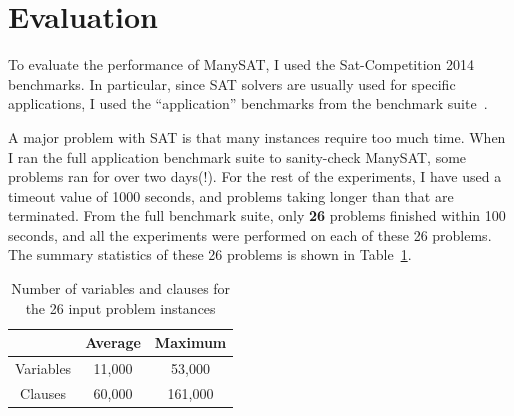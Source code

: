 \documentclass{article}
\begin{document}


















\section{Evaluation}

To evaluate the performance of ManySAT, I used the Sat-Competition
2014~\cite{sc14} benchmarks. In particular, since SAT solvers are
usually used for specific applications, I used the ``application''
benchmarks from the benchmark suite~\cite{sc14-app}.


A major problem with SAT is that many instances require too much
time. When I ran the full application benchmark suite to sanity-check
ManySAT, some problems ran for over two days(!). For the rest of the
experiments, I have used a timeout value of 1000 seconds, and problems
taking longer than that are terminated. From the full benchmark suite,
only \textbf{26} problems finished within 100 seconds, and all the
experiments were performed on each of these 26 problems. The summary
statistics of these 26 problems is shown in
Table~\ref{tab:input-stats}.

\begin{table}[h]
  \centering
  \begin{tabular}[h]{|c|c|c|}
\hline
     & Average & Maximum \\
\hline
Variables & 11,000 & 53,000 \\
Clauses & 60,000 & 161,000 \\
\hline
  \end{tabular}
  \caption{Number of variables and clauses for the 26 input problem instances}
  \label{tab:input-stats}
\end{table}
\end{document}

